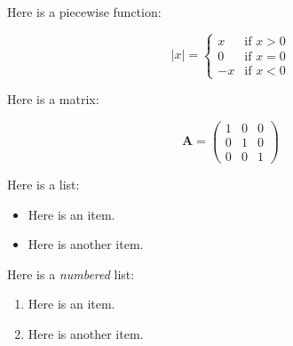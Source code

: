 \documentclass{article}
\begin{document}
Here is a piecewise function:

$$
|x| = \begin{cases}
x & \text{if } x>0\\
0 & \text{if } x=0\\
-x& \text{if } x<0
\end{cases}
$$

Here is a matrix:

$$\mathbf{A} = \begin{pmatrix}  1 & 0 & 0 \\ 0 & 1 & 0 \\ 0 & 0 & 1 \end{pmatrix}$$

Here is a list:

\begin{itemize}
\item Here is an item.
\item Here is another item.
\end{itemize}

Here is a \emph{numbered} list:

\begin{enumerate}
\item Here is an item.
\item Here is another item.
\end{enumerate}
\end{document}
